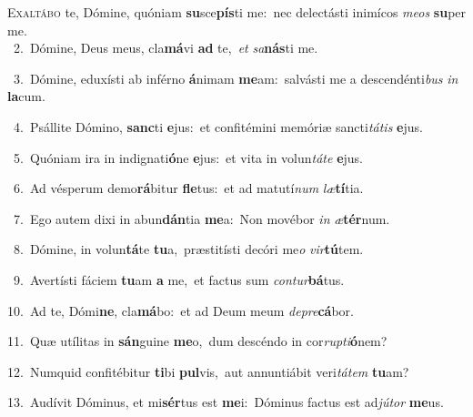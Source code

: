 \lettrine{\initial\textcolor{\initialcolor}{E}}{xaltábo} te, Dómine, quóniam \textbf{su}\-sce\-\textbf{pís}\-ti me:~\star nec delectásti inimícos \textit{me}\-\textit{os} \textbf{su}\-per me.\\
{\numbfont\textcolor{\numbcolor}{~2.}}~Dómine, Deus meus, cla\-\textbf{má}\-vi \textbf{ad} te,~\star \textit{et} \textit{sa}\-\textbf{nás}ti me.\par
{\numbfont\textcolor{\numbcolor}{~3.}}~Dómine, eduxísti ab inférno \textbf{á}\-nimam \textbf{me}\-am:~\star salvásti me a descendénti\textit{bus} \textit{in} \textbf{la}\-cum.\par
{\numbfont\textcolor{\numbcolor}{~4.}}~Psállite Dómino, \textbf{sanc}\-ti \textbf{e}\-jus:~\star et confitémini memóriæ sancti\-\textit{tá}\-\textit{tis} \textbf{e}\-jus.\par
{\numbfont\textcolor{\numbcolor}{~5.}}~Quóniam ira in indignati\-\textbf{ó}\-ne \textbf{e}\-jus:~\star et vita in volun\-\textit{tá}\-\textit{te} \textbf{e}\-jus.\par
{\numbfont\textcolor{\numbcolor}{~6.}}~Ad vésperum demo\-\textbf{rá}\-bitur \textbf{fle}\-tus:~\star et ad matutí\textit{num} \textit{læ}\-\textbf{tí}tia.\par
{\numbfont\textcolor{\numbcolor}{~7.}}~Ego autem dixi in abun\-\textbf{dán}\-tia \textbf{me}\-a:~\star Non movébor \textit{in} \textit{æ}\-\textbf{tér}num.\par
{\numbfont\textcolor{\numbcolor}{~8.}}~Dómine, in volun\-\textbf{tá}\-te \textbf{tu}\-a,~\star præstitísti decóri me\textit{o} \textit{vir}\-\textbf{tú}tem.\par
{\numbfont\textcolor{\numbcolor}{~9.}}~Avertísti fáciem \textbf{tu}\-am \textbf{a} me,~\star et factus sum \textit{con}\-\textit{tur}\textbf{bá}tus.\par
{\numbfont\textcolor{\numbcolor}{10.}}~Ad te, Dómi\-\textbf{ne}\-, cla\-\textbf{má}\-bo:~\star et ad Deum meum \textit{de}\-\textit{pre}\textbf{cá}bor.\par
{\numbfont\textcolor{\numbcolor}{11.}}~Quæ utílitas in \textbf{sán}\-guine \textbf{me}\-o,~\star dum descéndo in cor\-\textit{rup}\-\textit{ti}\textbf{ó}nem?\par
{\numbfont\textcolor{\numbcolor}{12.}}~Numquid confitébitur \textbf{ti}\-bi \textbf{pul}\-vis,~\star aut annuntiábit veri\-\textit{tá}\-\textit{tem} \textbf{tu}\-am?\par
{\numbfont\textcolor{\numbcolor}{13.}}~Audívit Dóminus, et mi\-\textbf{sér}\-tus est \textbf{me}\-i:~\star Dóminus factus est ad\-\textit{jú}\-\textit{tor} \textbf{me}\-us.\par
